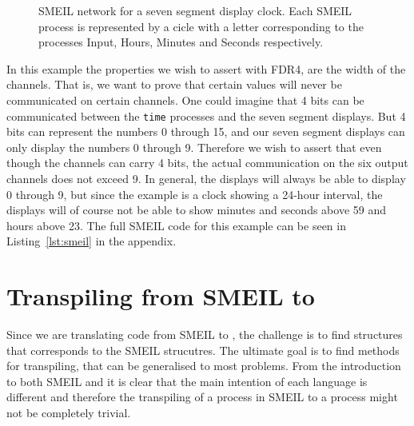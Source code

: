 \begin{figure}[!ht]
  \centering
  \caption{SMEIL network for a seven segment display clock. Each SMEIL process is represented by a cicle with a letter corresponding to the processes Input, Hours, Minutes and Seconds respectively.}
  \label{fig:smeil_network}
\end{figure}

In this example the properties we wish to assert with FDR4, are the width of the channels. That is, we want to prove that certain values will never be communicated on certain channels. One could imagine that 4 bits can be communicated between the \texttt{time} processes and the seven segment displays. But 4 bits can represent the numbers 0 through 15, and our seven segment displays can only display the numbers 0 through 9. Therefore we wish to assert that even though the channels can carry 4 bits, the actual communication on the six output channels does not exceed 9. In general, the displays will always be able to display 0 through 9, but since the example is a clock showing a 24-hour interval, the displays will of course not be able to show minutes and seconds above 59 and hours above 23. The full SMEIL code for this example can be seen in Listing~\ref{lst:smeil} in the appendix.
\section{Transpiling from SMEIL to \cspm{}}
\label{sec:transpiling}
Since we are translating code from SMEIL to \cspm{}, the challenge is to find \cspm{} structures that corresponds to the SMEIL strucutres. The ultimate goal is to find methods for transpiling, that can be generalised to most problems. From the introduction to both SMEIL and \cspm it is clear that the main intention of each language is different and therefore the transpiling of a process in SMEIL to a \cspm process might not be completely trivial.\\

